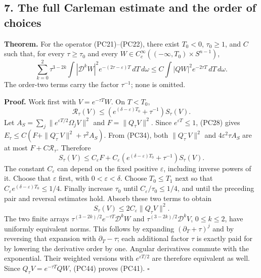 \documentclass[
  11pt,
]{article}
\makeatletter
\let\ReaderOriginalAnchorStart\hyper@anchorstart
\let\ReaderOriginalAnchorEnd\hyper@anchorend
\let\ReaderPendingAliases\@empty
\def\ReaderArmAliases#1{\gdef\ReaderPendingAliases{#1}}
\def\hyper@anchorstart#1{\ReaderIfNativeAnchorTF{#1}{\ReaderPendingAliases\global\let\ReaderPendingAliases\@empty}{}\ReaderOriginalAnchorStart{#1}}
\makeatother
\begin{document}
\ReaderArmAliases{\ReaderOriginalAnchorStart{AN03-PCU-007}\ReaderOriginalAnchorEnd\begingroup\expandafter\def\csname @currentHref\endcsname{AN03-PCU-007}\label{AN03-PCU-007}\endgroup\ReaderOriginalAnchorStart{an03-pcu-007-the-full-carleman-estimate-and-the-order-of-choices}\ReaderOriginalAnchorEnd\begingroup\expandafter\def\csname @currentHref\endcsname{an03-pcu-007-the-full-carleman-estimate-and-the-order-of-choices}\label{an03-pcu-007-the-full-carleman-estimate-and-the-order-of-choices}\endgroup\ReaderOriginalAnchorStart{7-the-full-carleman-estimate-and-the-order-of-choices}\ReaderOriginalAnchorEnd\begingroup\expandafter\def\csname @currentHref\endcsname{7-the-full-carleman-estimate-and-the-order-of-choices}\label{7-the-full-carleman-estimate-and-the-order-of-choices}\endgroup\ReaderOriginalAnchorStart{the-full-carleman-estimate-and-the-order-of-choices}\ReaderOriginalAnchorEnd}
\subsection{7. The full Carleman estimate and the order of
choices}\label{the-full-carleman-estimate-and-the-order-of-choices}

\textbf{Theorem.} For the operator (PC21)--(PC22), there exist
\(T_0<0\), \(\tau_0\geq1\), and \(C\) such that, for every
\(\tau\geq\tau_0\) and every
\(W\in C_c^\infty(( -\infty,T_0)\times S^{n-1})\), \[
\sum_{k=0}^2\tau^{3-2k}
 \int |\mathscr D^kW|^2e^{-(2\tau-\varepsilon)T}\,dT\,d\omega
\leq C\int|QW|^2e^{-2\tau T}\,dT\,d\omega.
\tag{PC41}
\] The order-two terms carry the factor \(\tau^{-1}\); none is omitted.

\textbf{Proof.} Work first with \(V=e^{-\tau T}W\). On \(T<T_0\), \[
\mathcal R_\tau(V)
\leq\left(e^{(\delta-\varepsilon)T_0}+\tau^{-1}\right)S_\tau(V).
\tag{PC42}
\] Let \(A_S=\sum_j\|e^{\varepsilon T/2}\Omega_jV\|^2\) and
\(F=\|Q_\tau V\|^2\). Since \(e^{\varepsilon T}\leq1\), (PC28) gives
\(E_\tau\leq C(F+\|Q_\tau^-V\|^2+\tau^2A_S)\). From (PC34), both
\(\|Q_\tau^-V\|^2\) and \(4\varepsilon^2\tau A_S\) are at most
\(F+C\mathcal R_\tau\). Therefore \[
S_\tau(V)\leq C_\varepsilon F
 +C_\varepsilon\left(e^{(\delta-\varepsilon)T_0}
                                  +\tau^{-1}\right)S_\tau(V).
\tag{PC43}
\] The constant \(C_\varepsilon\) can depend on the fixed positive
\(\varepsilon\), including inverse powers of it. Choose that
\(\varepsilon\) first, with \(0<\varepsilon<\delta\). Choose
\(T_0\leq T_1\) next so that
\(C_\varepsilon e^{(\delta-\varepsilon)T_0}\leq1/4\). Finally increase
\(\tau_0\) until \(C_\varepsilon/\tau_0\leq1/4\), and until the
preceding pair and reversal estimates hold. Absorb these two terms to
obtain \[
S_\tau(V)\leq2C_\varepsilon\|Q_\tau V\|^2.
\tag{PC44}
\] The two finite arrays \(\tau^{(3-2k)/2}e^{-\tau T}\mathscr D^kW\) and
\(\tau^{(3-2k)/2}\mathscr D^kV\), \(0\leq k\leq2\), have uniformly
equivalent norms. This follows by expanding \((\partial_T+\tau)^j\) and
by reversing that expansion with \(\partial_T-\tau\); each additional
factor \(\tau\) is exactly paid for by lowering the derivative order by
one. Angular derivatives commute with the exponential. Their weighted
versions with \(e^{\varepsilon T/2}\) are therefore equivalent as well.
Since \(Q_\tau V=e^{-\tau T}QW\), (PC44) proves (PC41). \(\square\)
\end{document}
